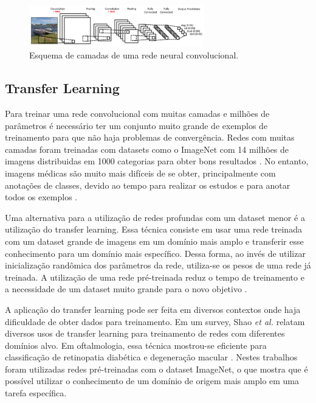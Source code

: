 \documentclass[conference]{IEEEtran}
\begin{document}
\begin{figure}[!tp]
  \centering
  \includegraphics[width=3in]{img/convolucao.png}
  \caption{Esquema de camadas de uma rede neural convolucional.}
  \label{fig:convolucao}
\end{figure}


  \subsection{Transfer Learning}


  Para treinar uma rede convolucional com muitas camadas e milhões de parâmetros é necessário ter um conjunto muito grande de exemplos de treinamento para que não haja problemas de convergência. Redes com muitas camadas foram treinadas com datasets como o ImageNet com 14 milhões de imagens distribuidas em 1000 categorias para obter bons resultados \cite{ILSVRC15}. No entanto, imagens médicas são muito mais difíceis de se obter, principalmente com anotações de classes, devido ao tempo para realizar os estudos e para anotar todos os exemplos \cite{greenspan2016}.
  
  Uma alternativa para a utilização de redes profundas com um dataset menor é a utilização do transfer learning. Essa técnica consiste em usar uma rede treinada com um dataset grande de imagens em um domínio mais amplo e transferir esse conhecimento para um domínio mais específico. Dessa forma, ao invés de utilizar inicialização randômica dos parâmetros da rede, utiliza-se os pesos de uma rede já treinada. A utilização de uma rede pré-treinada reduz o tempo de treinamento e a necessidade de um dataset muito grande para o novo objetivo \cite{tan2018}.

  A aplicação do transfer learning pode ser feita em diversos contextos onde haja dificuldade de obter dados para treinamento. Em um survey, Shao \textit{et al.} \cite{shao2015} relatam diversos usos de transfer learning para treinamento de redes com diferentes domínios alvo. Em oftalmologia, essa técnica mostrou-se eficiente para classificação de retinopatia diabética \cite{li2017} e degeneração macular \cite{lee2017}. Nestes trabalhos foram utilizadas redes pré-treinadas com o dataset ImageNet, o que mostra que é possível utilizar o conhecimento de um domínio de origem mais amplo em uma tarefa específica. 
\end{document}
